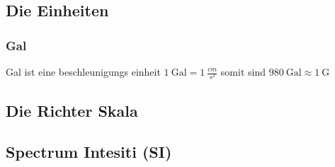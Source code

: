 \documentclass[class=scrbook, crop=false]{standalone}
\begin{document}
\subsection{Die Einheiten}
\subsubsection{Gal}
Gal ist eine beschleunigungs einheit $1~\mathrm{Gal} = 1~\frac{cm}{s^2}$ somit sind $ 980 ~\mathrm{Gal} \approx 1~\mathrm{G}$



\subsection{Die Richter Skala}

\subsection{Spectrum Intesiti (SI)}



\ifstandalone
    \printbibliography[heading=bibintoc]                         \cleardoublepage




\fi
\end{document}
